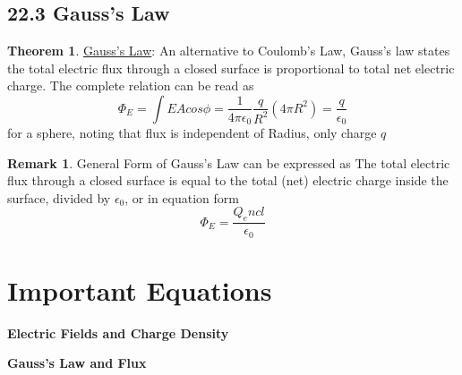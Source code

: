 \documentclass[12pt]{amsart}
\theoremstyle{definition}
\newtheorem{theorem}{Theorem}  %
\newtheorem*{remark}{Remark}        %
\numberwithin{equation}{theorem}    %
\begin{document}
\subsection*{22.3 Gauss's Law}

\begin{theorem}
    \underline{Gauss's Law}:
    An alternative to Coulomb's Law, Gauss's law states the total electric flux
    through a closed surface is proportional to total net electric charge. The
    complete relation can be read as 
    $$\Phi_E = \int EA cos\phi = \frac{1}{4\pi \epsilon_0} \frac{q}{R^2}(4\pi R^2) = \frac{q}{\epsilon_0}$$
    for a sphere, noting that flux is independent of Radius, only charge $q$


    \begin{remark}
        General Form of Gauss's Law can be expressed as The total electric 
        flux through a closed surface is equal to the total (net) electric 
        charge inside the surface, divided by $\epsilon_0$, or in equation form 
        $$\Phi_E = \frac{Q_encl}{\epsilon_0}$$
    \end{remark}
\end{theorem}


\pagebreak

\section*{Important Equations}


\textbf{Electric Fields and Charge Density}

\textbf{Gauss's Law and Flux}
\end{document}
